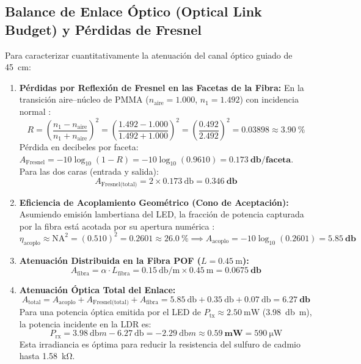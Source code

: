 \documentclass[11pt,letterpaper]{article}
\begin{document}
\subsection{Balance de Enlace Óptico (Optical Link Budget) y Pérdidas de Fresnel}
Para caracterizar cuantitativamente la atenuación del canal óptico guiado de \SI{45}{\centi\meter}:
\begin{enumerate}
    \item \textbf{Pérdidas por Reflexión de Fresnel en las Facetas de la Fibra:}
    En la transición aire--núcleo de PMMA ($n_{\text{aire}} = 1.000$, $n_1 = 1.492$) con incidencia normal \cite{tipler2010,ziemann2008}:
    \begin{equation}
    R = \left( \frac{n_1 - n_{\text{aire}}}{n_1 + n_{\text{aire}}} \right)^2 = \left( \frac{1.492 - 1.000}{1.492 + 1.000} \right)^2 = \left( \frac{0.492}{2.492} \right)^2 = 0.03898 \approx \mathbf{\SI{3.90}{\percent}}
    \end{equation}
    Pérdida en decibeles por faceta: $A_{\text{Fresnel}} = -10\log_{10}(1 - R) = -10\log_{10}(0.9610) = \mathbf{\SI{0.173}{\decibel}/\text{faceta}}$. Para las dos caras (entrada y salida):
    \begin{equation}
    A_{\text{Fresnel(total)}} = 2 \times \SI{0.173}{\decibel} = \mathbf{\SI{0.346}{\decibel}}
    \end{equation}
    \item \textbf{Eficiencia de Acoplamiento Geométrico (Cono de Aceptación):}
    Asumiendo emisión lambertiana del LED, la fracción de potencia capturada por la fibra está acotada por su apertura numérica \cite{kasap2013}:
    \begin{equation}
    \eta_{\text{acoplo}} \approx \mathrm{NA}^2 = (0.510)^2 = 0.2601 \approx \mathbf{\SI{26.0}{\percent}} \implies A_{\text{acoplo}} = -10\log_{10}(0.2601) = \mathbf{\SI{5.85}{\decibel}}
    \end{equation}
    \item \textbf{Atenuación Distribuida en la Fibra POF ($L = \SI{0.45}{\meter}$):}
    \begin{equation}
    A_{\text{fibra}} = \alpha \cdot L_{\text{fibra}} = \SI{0.15}{\decibel\per\meter} \times \SI{0.45}{\meter} = \mathbf{\SI{0.0675}{\decibel}}
    \end{equation}
    \item \textbf{Atenuación Óptica Total del Enlace:}
    \begin{equation}
    A_{\text{total}} = A_{\text{acoplo}} + A_{\text{Fresnel(total)}} + A_{\text{fibra}} = \SI{5.85}{\decibel} + \SI{0.35}{\decibel} + \SI{0.07}{\decibel} = \mathbf{\SI{6.27}{\decibel}}
    \end{equation}
    Para una potencia óptica emitida por el LED de $P_{\text{tx}} \approx \SI{2.50}{\milli\watt}$ (\SI{+3.98}{\decibel m}), la potencia incidente en la LDR es:
    \begin{equation}
    P_{\text{rx}} = \SI{+3.98}{\decibel m} - \SI{6.27}{\decibel} = \SI{-2.29}{\decibel m} \approx \mathbf{\SI{0.59}{\milli\watt}} = \SI{590}{\micro\watt}
    \end{equation}
    Esta irradiancia es óptima para reducir la resistencia del sulfuro de cadmio hasta \SI{1.58}{\kilo\ohm}.
\end{enumerate}
\end{document}
